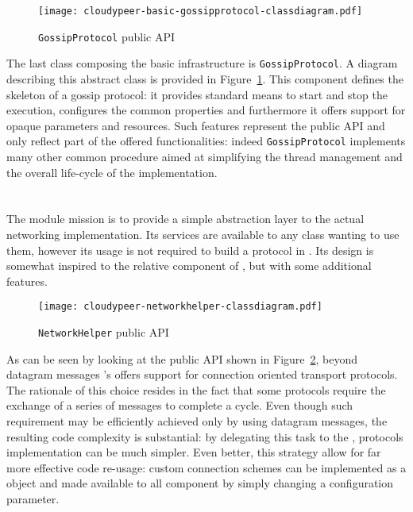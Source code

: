 \begin{figure}[h!]
  \centering
  \texttt{[image: cloudypeer-basic-gossipprotocol-classdiagram.pdf]}
  \caption{\texttt{GossipProtocol} public API}
  \label{fig:cloudypeer-gossipprotocol-class}
\end{figure}

The last class composing the basic infrastructure is
\texttt{GossipProtocol}. A diagram describing this abstract class is
provided in Figure~\ref{fig:cloudypeer-gossipprotocol-class}. This
component defines the skeleton of a gossip protocol: it provides
standard means to start and stop the execution, configures the common
properties and furthermore it offers support for opaque parameters
and resources. Such features represent the public API and
only reflect part of the offered functionalities: indeed
\texttt{GossipProtocol} implements many other common procedure aimed at
simplifying the thread management and the overall life-cycle of the
implementation.

\section{\networkhelper}
The \networkhelper module mission is to provide a simple abstraction
layer to the actual networking implementation. Its services are
available to any class wanting to use them, however its usage is not
required to build a protocol in \cloudypeer. Its design is somewhat
inspired to the relative component of \grapes, but with some
additional features.

\begin{figure}[h!]
  \centering
  \texttt{[image: cloudypeer-networkhelper-classdiagram.pdf]}
  \caption{\texttt{NetworkHelper} public API}
  \label{fig:cloudypeer-nethelper-class}
\end{figure}

As can be seen by looking at the public API shown in
Figure~\ref{fig:cloudypeer-nethelper-class}, beyond datagram messages
\cloudypeer's \networkhelper offers support for connection oriented
transport protocols. The rationale of this choice resides in the fact
that some \ptop protocols require the exchange of a series of messages
to complete a cycle. Even though such requirement may be efficiently
achieved only by using datagram messages, the resulting code complexity is
substantial: by delegating this task to the \networkhelper, protocols
implementation can be much simpler. Even better, this strategy allow
for far more effective code re-usage: custom connection schemes can be
implemented as a \networkhelper object and made available to
all \cloudypeer component by simply changing a configuration parameter.

